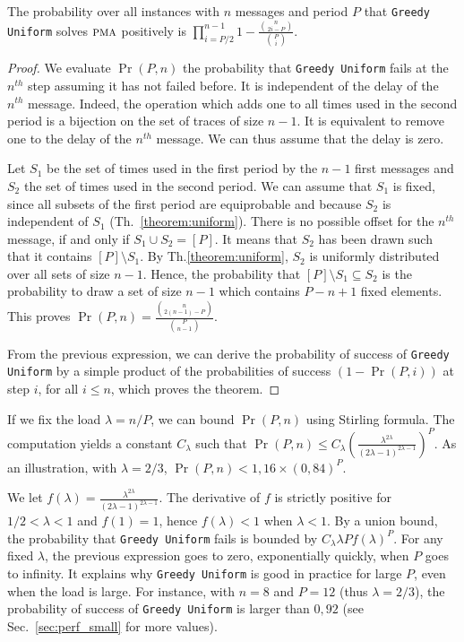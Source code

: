 \documentclass[a4paper,UKenglish,cleveref, autoref, thm-restate]{lipics-v2019}
\newcommand\pma{\textsc{pma}\xspace}
\newcommand\greedyuniform{\texttt{Greedy Uniform}\xspace}
\begin{document}
\begin{theorem}\label{theorem:uniform}
The probability over all instances with $n$ messages and period $P$ that \greedyuniform solves $\pma$ positively is $\displaystyle{\prod_{i=P/2}^{n-1}1 - \frac{\binom{n}{2i-P}}{\binom{P}{i}}}$.
\end{theorem}
\begin{proof}
We evaluate $\Pr(P,n)$ the probability that \greedyuniform fails at the $n^{th}$ step assuming it has not failed before. It is independent of the delay of the $n^{th}$ message. Indeed, the operation which adds one to all times used in the second period is a bijection on the set of traces of size $n-1$. It is equivalent to remove one to the delay of the $n^{th}$ message. We can thus assume that the delay is zero.

Let $S_1$ be the set of times used in the first period by the $n-1$ first messages
and $S_2$ the set of times used in the second period. We can assume that $S_1$ is fixed, since all subsets of the first period are equiprobable and because $S_2$ is independent of $S_1$ (Th.~\ref{theorem:uniform}). There is no possible offset for the $n^{th}$ message, if and only if $S_1 \cup S_2 = [P]$. It means that $S_2$ has been drawn such that it contains $[P] \setminus S_1$. By Th.\ref{theorem:uniform}, $S_2$ is uniformly distributed over all sets of size $n-1$. Hence, the probability that  $[P]  \setminus S_1 \subseteq S_2$  is the probability to draw a set of size $n-1$ which contains $P-n + 1$ fixed elements. This proves $\Pr(P,n) = \frac{\binom{n}{2(n-1)-P}}{\binom{P}{n-1}}$.

From the previous expression, we can derive the probability of success of \greedyuniform by a simple product of 
the probabilities of success $(1 - \Pr(P,i))$ at step $i$, for all $i \leq n$, which proves the theorem. 
\end{proof}


If we fix the load $\lambda = n/P$, we can bound $\Pr(P,n)$ using Stirling formula. The computation yields a constant $C_{\lambda}$
such that $\Pr(P,n) \leq C_{\lambda} \left(\frac{\lambda^{2\lambda}}{(2\lambda -1)^{2\lambda -1}}\right)^P$.
As an illustration, with $\lambda = 2/3$, $\Pr(P,n) < 1,16 \times (0,84)^P$.

We let $f(\lambda) = \frac{\lambda^{2\lambda}}{(2\lambda -1)^{2\lambda -1}}$.
The derivative of $f$ is strictly positive for $1/2 < \lambda < 1$ and $f(1) = 1$, hence 
$f(\lambda) < 1$ when $\lambda < 1$. By a union bound, the probability that \greedyuniform fails is bounded by $C_{\lambda} \lambda P f(\lambda)^P$. For any fixed $\lambda$, the previous expression goes to zero, exponentially quickly, when $P$ goes to infinity. It explains why \greedyuniform is good in practice for large $P$, even when the load is large. 
For instance, with $n = 8$ and $P=12$ (thus $\lambda = 2/3$), the probability of success of \greedyuniform is larger than $0,92$ (see Sec.~\ref{sec:perf_small} for more values).
\end{document}
